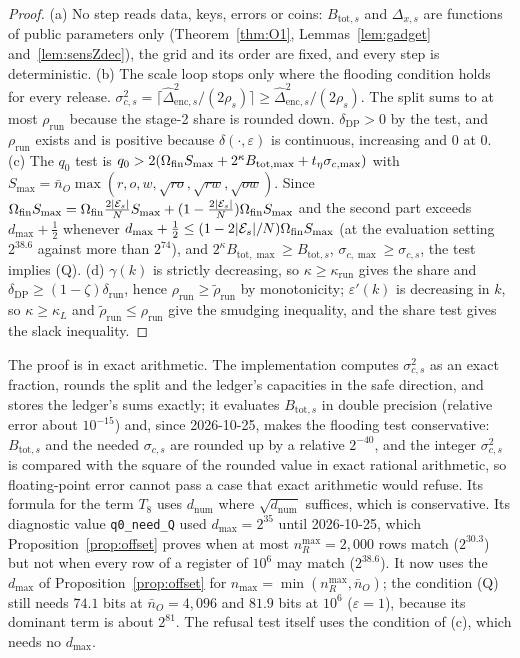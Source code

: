 \begin{proof}
(a) No step reads data, keys, errors or coins: $B_{\mathrm{tot},s}$ and $\Delta_{x,s}$ are functions of public parameters only (Theorem~\ref{thm:O1}, Lemmas~\ref{lem:gadget} and~\ref{lem:sensZdec}), the grid and its order are fixed, and every step is deterministic. (b) The scale loop stops only where the flooding condition holds for every release. $\sigma_{c,s}^2=\lceil\widehat\Delta_{\mathrm{enc},s}^2/(2\rho_s)\rceil\ge\widehat\Delta_{\mathrm{enc},s}^2/(2\rho_s)$. The split sums to at most $\rho_{\mathrm{run}}$ because the stage-2 share is rounded down. $\delta_{\mathrm{DP}}>0$ by the test, and $\rho_{\mathrm{run}}$ exists and is positive because $\delta(\cdot,\varepsilon)$ is continuous, increasing and $0$ at $0$. (c) The $q_0$ test is $q_0>2(\Omega_{\mathrm{fin}} S_{\max}+2^\kappa B_{\mathrm{tot},\max}+t_\eta\sigma_{c,\max})$ with $S_{\max}=\bar n_O\max(r,o,w,\sqrt{ro},\sqrt{rw},\sqrt{ow})$. Since $\Omega_{\mathrm{fin}} S_{\max}=\Omega_{\mathrm{fin}}\tfrac{2|\mathcal E_s|}NS_{\max}+(1-\tfrac{2|\mathcal E_s|}N)\Omega_{\mathrm{fin}} S_{\max}$ and the second part exceeds $d_{\max}+\tfrac12$ whenever $d_{\max}+\tfrac12\le(1-2|\mathcal E_s|/N)\Omega_{\mathrm{fin}} S_{\max}$ (at the evaluation setting $2^{38.6}$ against more than $2^{74}$), and $2^\kappa B_{\mathrm{tot},\max}\ge B_{\mathrm{tot},s}$, $\sigma_{c,\max}\ge\sigma_{c,s}$, the test implies (Q). (d) $\gamma(k)$ is strictly decreasing, so $\kappa\ge\kappa_{\mathrm{run}}$ gives the share and $\delta_{\mathrm{DP}}\ge(1-\zeta)\delta_{\mathrm{run}}$, hence $\rho_{\mathrm{run}}\ge\tilde\rho_{\mathrm{run}}$ by monotonicity; $\varepsilon'(k)$ is decreasing in $k$, so $\kappa\ge\kappa_L$ and $\tilde\rho_{\mathrm{run}}\le\rho_{\mathrm{run}}$ give the smudging inequality, and the share test gives the slack inequality.
\end{proof}

\begin{remark}
The proof is in exact arithmetic. The implementation computes $\sigma_{c,s}^2$ as an exact fraction, rounds the split and the ledger's capacities in the safe direction, and stores the ledger's sums exactly; it evaluates $B_{\mathrm{tot},s}$ in double precision (relative error about $10^{-15}$) and, since 2026-10-25, makes the flooding test conservative: $B_{\mathrm{tot},s}$ and the needed $\sigma_{c,s}$ are rounded up by a relative $2^{-40}$, and the integer $\sigma_{c,s}^2$ is compared with the square of the rounded value in exact rational arithmetic, so floating-point error cannot pass a case that exact arithmetic would refuse. Its formula for the term $T_8$ uses $d_{\mathrm{num}}$ where $\sqrt{d_{\mathrm{num}}}$ suffices, which is conservative. Its diagnostic value \texttt{q0\_need\_Q} used $d_{\max}=2^{35}$ until 2026-10-25, which Proposition~\ref{prop:offset} proves when at most $n_R^{\max}=2{,}000$ rows match ($2^{30.3}$) but not when every row of a register of $10^6$ may match ($2^{38.6}$). It now uses the $d_{\max}$ of Proposition~\ref{prop:offset} for $n_{\max}=\min(n_R^{\max},\bar n_O)$; the condition (Q) still needs $74.1$ bits at $\bar n_O=4{,}096$ and $81.9$ bits at $10^6$ ($\varepsilon=1$), because its dominant term is about $2^{81}$. The refusal test itself uses the condition of (c), which needs no $d_{\max}$.
\end{remark}

